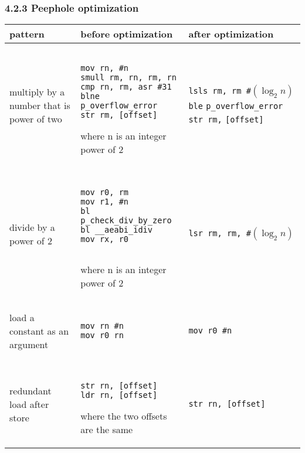 \documentclass[10pt,a4paper,]{report}
\newenvironment{tabularverbatim}
 {\VerbatimEnvironment
  \begin{BVerbatim}[baseline=c,formatcom=\setlength{\baselineskip}{\normalbaselineskip}]}
 {\end{BVerbatim}}
\begin{document}
  \subsubsection*{4.2.3 Peephole optimization}
  \begin{center}
    \begin{tabular}{| m{3cm} | m{4cm} | m{4cm} |}
      \hline
      pattern & before optimization & after optimization \\
      \hline
      multiply by a number that is power of two &
      \begin{tabularverbatim}

mov rn, #n
smull rm, rn, rm, rn
cmp rn, rm, asr #31
blne p_overflow_error
str rm, [offset]

      \end{tabularverbatim}
      \newline
      where n is an integer power of 2
      &
      \texttt{lsls rm, rm \#$(\log_2 n)$}
      \newline
      \texttt{ble} \verb|p_overflow_error|
      \newline
      \texttt{str rm,} \verb|[offset]|
      \\
      \hline
      divide by a power of 2 &
      \begin{tabularverbatim}

mov r0, rm
mov r1, #n
bl p_check_div_by_zero
bl __aeabi_idiv
mov rx, r0
 
      \end{tabularverbatim}
      \newline
      where n is an integer power of 2
      &
      \texttt{lsr rm, rm, \#$(\log_2 n)$}
      \\
      \hline
      load a constant as an argument &
      \begin{tabularverbatim}

mov rn #n
mov r0 rn
 
      \end{tabularverbatim}
      &
      \begin{tabularverbatim}
mov r0 #n

      \end{tabularverbatim}
      \\
      \hline
      redundant load after store &
      \begin{tabularverbatim}

str rn, [offset]
ldr rn, [offset]

      \end{tabularverbatim}
      \newline
      where the two offsets are the same
      &
      \begin{tabularverbatim}
str rn, [offset]
      \end{tabularverbatim}
      \\
      \hline
    \end{tabular}
  \end{center}
\end{document}
